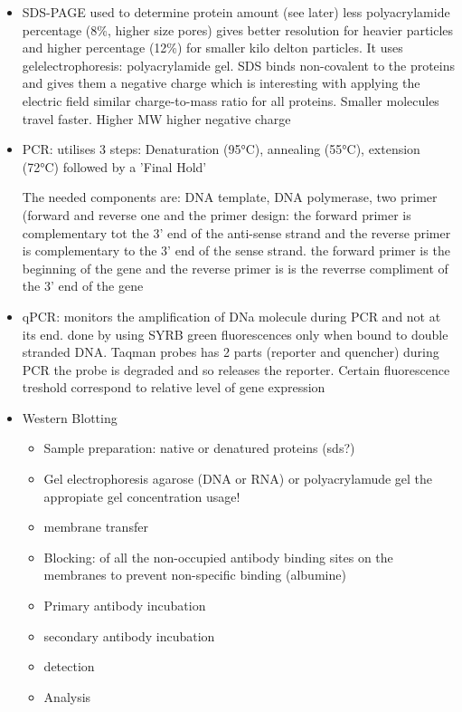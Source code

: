 \documentclass{article}
\begin{document}
\begin{itemize}
    \item SDS-PAGE used to determine protein amount (see later)
    less polyacrylamide percentage (8\%, higher size pores) gives better resolution for heavier particles and higher percentage (12\%) for smaller kilo delton particles.
    It uses gelelectrophoresis: polyacrylamide gel. SDS binds non-covalent to the proteins and gives them a negative charge which is interesting with applying the electric field similar charge-to-mass ratio for all proteins. Smaller molecules travel faster. Higher MW higher negative charge
    
    \item PCR: utilises 3 steps: Denaturation (95°C), annealing (55°C), extension (72°C) followed by a 'Final Hold'

    The needed components are: DNA template, DNA polymerase, two primer (forward and reverse one and the primer design: the forward primer is complementary tot the 3' end of the anti-sense strand  and the reverse primer is complementary to the 3' end of the sense strand. the forward primer is the beginning of the gene and the reverse primer is is the reverrse compliment of the 3' end of the gene

    \item qPCR: monitors the amplification of DNa molecule during PCR and not at its end. done by using SYRB green fluorescences only when bound to double stranded DNA. Taqman probes has 2 parts (reporter and quencher) during PCR the probe is degraded and so releases the reporter. Certain fluorescence treshold correspond to relative level of gene expression

    \item Western Blotting
    \begin{itemize}
        \item Sample preparation: native or denatured proteins (sds?)
        \item Gel electrophoresis agarose (DNA or RNA) or polyacrylamude gel the appropiate gel concentration usage!
        \item membrane transfer
        \item Blocking: of all the non-occupied antibody binding sites on the membranes to prevent non-specific binding (albumine)
        \item Primary antibody incubation
        \item secondary antibody incubation
        \item detection
        \item Analysis
    \end{itemize}
    

\end{itemize}
\end{document}
